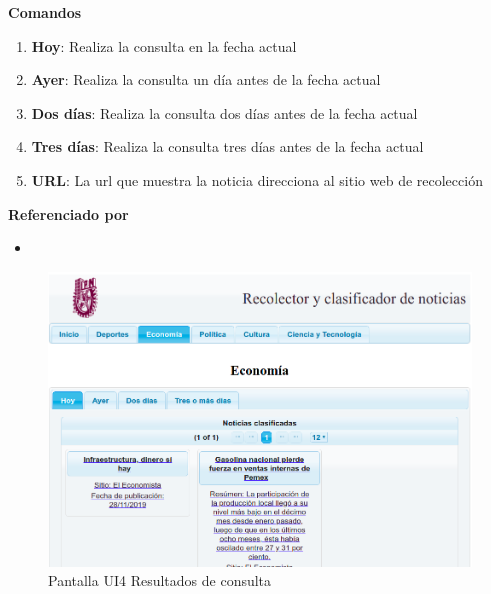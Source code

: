 \textbf{Comandos}

\begin{enumerate}

  \item \textbf{Hoy}: Realiza la consulta en la fecha actual
  \item \textbf{Ayer}: Realiza la consulta un día antes de la fecha actual
  \item \textbf{Dos días}: Realiza la consulta dos días antes de la fecha actual
  \item \textbf{Tres días}: Realiza la consulta tres días antes de la fecha actual
  \item \textbf{URL}: La url que muestra la noticia direcciona al sitio web de recolección


\end{enumerate}

\begin{large}
  \textbf{Referenciado por}
\end{large}

\begin{itemize}

  \item {}

\end{itemize}  



\begin{figure}[H]
  \centering
  \includegraphics[scale=.4]{imagenes/Pantallas/UI4}
  \caption{Pantalla UI4 Resultados de consulta}
  \label{fig:UI4}
\end{figure}

